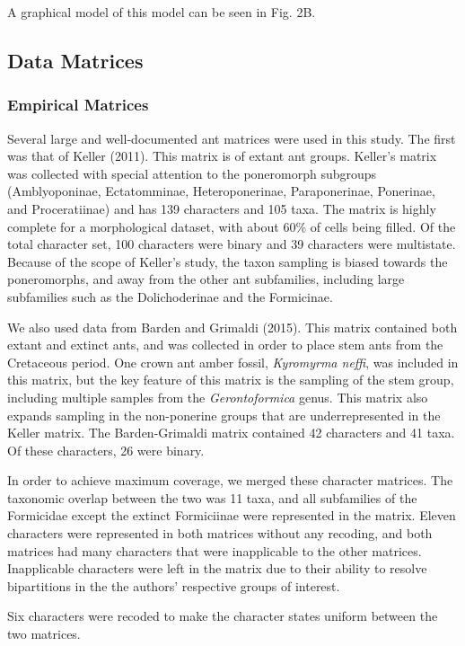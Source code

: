 \documentclass[]{article}
\begin{document}
A graphical model of this model can be seen in Fig. 2B. 


\subsection{Data Matrices}
\subsubsection{Empirical Matrices}
Several large and well-documented ant matrices were used in this study.
The first was that of Keller (2011). 
This matrix is of extant ant groups. 
Keller's matrix was collected with special attention to the poneromorph subgroups (Amblyoponinae, Ectatomminae,
Heteroponerinae, Paraponerinae, Ponerinae, and Proceratiinae) and has 139 characters and 105 taxa.
The matrix is highly complete for a morphological dataset, with about 60\% of cells being filled.
Of the total character set, 100 characters were binary and 39 characters were multistate.
Because of the scope of Keller's study, the taxon sampling is biased towards the poneromorphs, and away from the other ant subfamilies, including large subfamilies such as the Dolichoderinae and the Formicinae. \par
We also used data from Barden and Grimaldi (2015). 
This matrix contained both extant and extinct ants, and was collected in order to place stem ants from the Cretaceous period.
One crown ant amber fossil, \textit{Kyromyrma neffi}, was included in this matrix, but the key feature of this matrix is the sampling of the stem group, including multiple samples from the \textit{Gerontoformica} genus.
This matrix also expands sampling in the non-ponerine groups that are underrepresented in the Keller matrix.
The Barden-Grimaldi matrix contained 42 characters and 41 taxa. 
Of these characters, 26 were binary.\par
In order to achieve maximum coverage, we merged these character matrices.
The taxonomic overlap between the two was 11 taxa, and all subfamilies of the Formicidae except the extinct Formiciinae were represented in the matrix. 
Eleven characters were represented in both matrices without any recoding, and both matrices had many characters that were inapplicable to the other matrices.
Inapplicable characters were left in the matrix due to their ability to resolve bipartitions in the the authors' respective groups of interest. \par
Six characters were recoded to make the character states uniform between the two matrices.
\end{document}

